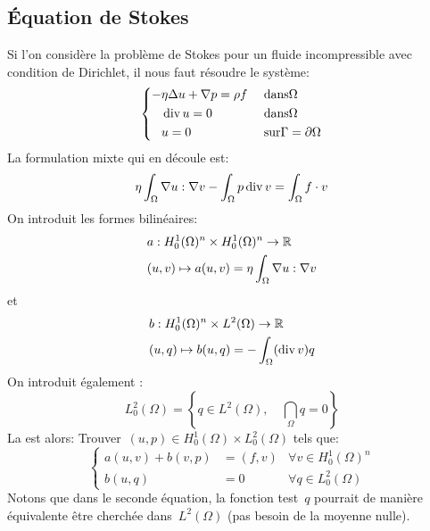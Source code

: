 \subsection{Équation de Stokes}
Si l'on considère la problème de Stokes pour un fluide incompressible avec condition de Dirichlet, il
nous faut résoudre le système:
\begin{equation}\left\{
\begin{aligned}
-&\eta \Delta u + \nabla p = \rho f && \text{ dans} \Omega\\
&\operatorname{div} u = 0&& \text{ dans} \Omega\\
&u =0&& \text{ sur} \Gamma=\partial\Omega
\end{aligned}\right.
\end{equation}
La formulation mixte qui en découle est:
\begin{equation}
\eta\dint_\Omega \nabla u: \nabla v %
- \dint_\Omega p \dive v %
= \dint_\Omega f\cdot v %
\end{equation}
On introduit les formes bilinéaires:
\begin{equation}
\begin{aligned}
&a: H^1_0(\Omega)^n\times H^1_0(\Omega)^n \rightarrow \mathbb R \\
&(u,v) \mapsto a(u,v)=\eta\displaystyle\int_\Omega \nabla u: \nabla v
\end{aligned}
\end{equation}
et
\begin{equation}
\begin{aligned}
&b: H^1_0(\Omega)^n\times L^2(\Omega) \rightarrow \mathbb R\\
&(u,q) \mapsto b(u,q)=-\displaystyle\int_\Omega (\operatorname{div} v) q
\end{aligned}
\end{equation}
\medskip
On introduit également :
\begin{equation}L^2_0(\Omega)=\left\{ q\in L^2(\Omega),\quad \dint_\Omega q %
= 0\right\}\end{equation}
\medskip
La  est alors:
Trouver~$(u,p)\in H^1_0(\Omega)\times L^2_0(\Omega)$ tels que:
\begin{equation}\left\{
\begin{array}{rll}
a(u,v)+b(v,p) &= (f,v) & \forall v\in H^1_0(\Omega)^n \\
b(u,q) &=0 &\forall q \in L^2_0(\Omega)
\end{array}\right.
\end{equation}
Notons que dans le seconde équation, la fonction test~$q$ pourrait de manière équivalente
être cherchée dans~$L^2(\Omega)$ (pas besoin de la moyenne nulle).

